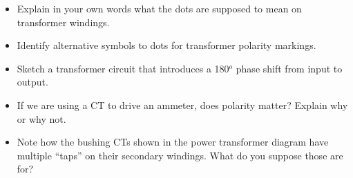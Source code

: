 \begin{itemize}
\item{} Explain in your own words what the dots are supposed to mean on transformer windings.
\item{} Identify alternative symbols to dots for transformer polarity markings.
\item{} Sketch a transformer circuit that introduces a 180$^{o}$ phase shift from input to output.
\item{} If we are using a CT to drive an ammeter, does polarity matter?  Explain why or why not.
\item{} Note how the bushing CTs shown in the power transformer diagram have multiple ``taps'' on their secondary windings.  What do you suppose those are for?
\end{itemize}





